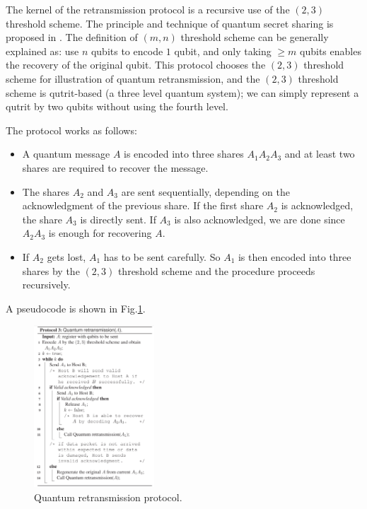\documentclass[10pt]{article}
\begin{document}
The kernel of the retransmission protocol is a recursive use of the $(2,3)$ threshold scheme. The principle and technique of quantum secret sharing is proposed in \cite{cleve1999share}. The definition of $(m,n)$ threshold scheme can be generally explained as: use $n$ qubits to encode $1$ qubit, and only taking $\geq m$ qubits enables the recovery of the original qubit. This protocol chooses the $(2,3)$ threshold scheme for illustration of quantum retransmission, and the $(2,3)$ threshold scheme is qutrit-based (a three level quantum system); we can simply represent a qutrit by two qubits without using the fourth level. 

The protocol works as follows:
\begin{itemize}
    \item A quantum message $A$ is encoded into three shares $A_1A_2A_3$ and at least two shares are required to recover the message.
    \item The shares $A_2$ and $A_3$ are sent sequentially, depending on the acknowledgment of the previous share. If the first share $A_2$ is acknowledged, the share $A_3$ is directly sent. If $A_3$ is also acknowledged, we are done since $A_2A_3$ is enough for recovering $A$. 
    \item If $A_2$ gets lost, $A_1$ has to be sent carefully. So $A_1$ is then encoded into three shares by the $(2,3)$ threshold scheme and the procedure proceeds recursively.
\end{itemize}

A pseudocode is shown in Fig.\ref{retransmission}.

\begin{figure}[htbp]
    \centering
    \includegraphics[width=0.4\textwidth]{figure/algo.jpg}
    \caption{Quantum retransmission protocol.}
    \label{retransmission}
\end{figure}
\end{document}
